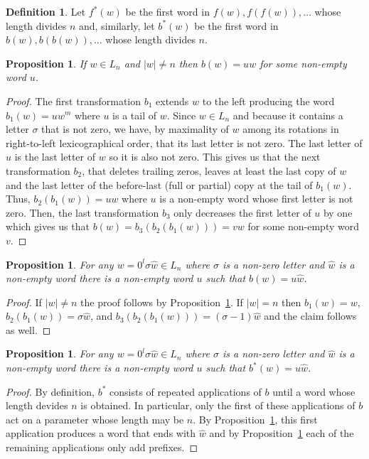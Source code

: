 \documentclass{article}
\newtheorem{proposition}[theorem]{Proposition}
\theoremstyle{definition}
\newtheorem{definition}{Definition}
\begin{document}
\begin{definition}
	Let $f^*(w)$ be the first word in ${f(w),f(f(w)),\dots}$ whose length divides $n$ and, similarly, let $b^*(w)$ be the first word in ${b(w),b(b(w)),\dots}$ whose length divides $n$. 
\end{definition}

\begin{proposition}
	\label{w-at-the-tail}
	If $w \in L_n$ and $|w| \neq n$ then  $b(w)=uw$ for some non-empty word $u$. 
\end{proposition}
\begin{proof}
	The first transformation $b_1$ extends $w$ to the left producing the word $b_1(w)=uw^m$ where $u$ is a tail of $w$. Since $w \in L_n$ and because it contains a letter $\sigma$ that is not zero, we have, by maximality of $w$ among its rotations in right-to-left lexicographical order,  that its last letter is not zero. The last letter of $u$ is the last letter of $w$ so it is also not zero. This gives us that the next transformation $b_2$, that deletes trailing zeros, leaves at least the last copy of $w$ and the last letter of the before-last (full or partial) copy at the tail of $b_1(w)$. Thus, $b_2(b_1(w))=uw$ where $u$ is a non-empty word whose first letter is not zero. Then, the last transformation $b_3$ only decreases the first letter of $u$ by  one which gives us that $b(w)=b_3(b_2(b_1(w)))=vw$ for some non-empty word $v$.	
\end{proof}
	
\begin{proposition}
	\label{hat-w-at-the-tail}
	For any $w=0^l \sigma \hat{w}\in L_n$ where $\sigma$ is a non-zero letter and $\hat{w}$ is a non-empty word there is a non-empty word $u$ such that $b(w)=u\hat{w}$.
\end{proposition}
\begin{proof}
	If $|w|\neq n$ the proof follows by Proposition~\ref{w-at-the-tail}. If $|w|=n$ then $b_1(w)=w$, $b_2(b_1(w))=\sigma\hat{w}$, and $b_3(b_2(b_1(w)))=(\sigma-1)\hat{w}$ and the claim follows as well.
\end{proof}
	
	
\begin{proposition}
	\label{tail-is-preserved*}
	For any $w=0^l \sigma \hat{w}\in L_n$ where $\sigma$ is a non-zero letter and $\hat{w}$ is a non-empty word there is a non-empty word $u$ such that $b^*(w)=u\hat{w}$.
\end{proposition}
\begin{proof}
By definition, $b^*$ consists of repeated applications of $b$ until a word whose length devides $n$ is obtained. In particular, only the first of these applications of $b$ act on a parameter whose length may be $n$. By Proposition~\ref{hat-w-at-the-tail}, this first application produces a word that ends with $\hat{w}$ and by Proposition~\ref{w-at-the-tail} each of the remaining applications only add prefixes. 
\end{proof}
\end{document}
